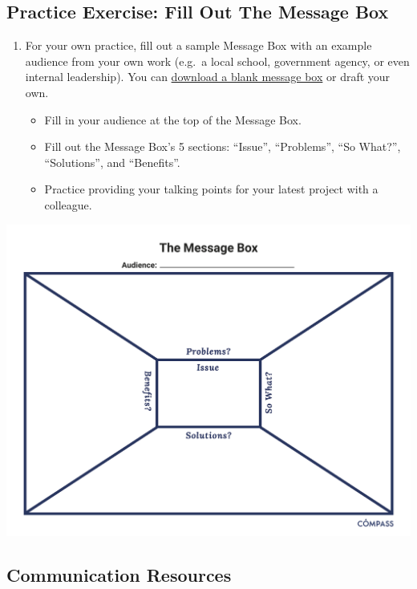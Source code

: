 \documentclass[
]{book}
\providecommand{\tightlist}{%
  \setlength{\itemsep}{0pt}\setlength{\parskip}{0pt}}
\begin{document}
\hypertarget{practice-exercise-fill-out-the-message-box}{%
\subsection{Practice Exercise: Fill Out The Message Box}\label{practice-exercise-fill-out-the-message-box}}

\begin{enumerate}
\def\labelenumi{\arabic{enumi}.}
\item
  For your own practice, fill out a sample Message Box with an example audience from your own work (e.g.~a local school, government agency, or even internal leadership). You can \href{files/Message-Box-Blank.pdf}{download a blank message box} or draft your own.

  \begin{itemize}
  \tightlist
  \item
    Fill in your audience at the top of the Message Box.
  \item
    Fill out the Message Box's 5 sections: ``Issue'', ``Problems'', ``So What?'', ``Solutions'', and ``Benefits''.
  \item
    Practice providing your talking points for your latest project with a colleague.
  \end{itemize}
\end{enumerate}

\includegraphics{images/message-box-blank.png}

\hypertarget{communication-resources}{%
\subsection{Communication Resources}\label{communication-resources}}
\end{document}

